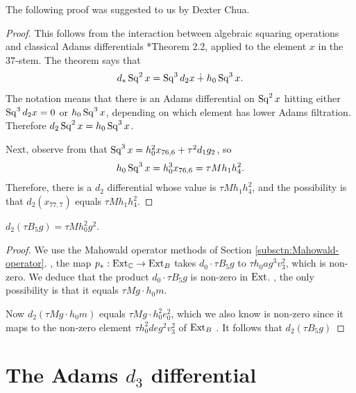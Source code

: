 The following proof was suggested to us by Dexter Chua.

\begin{proof}
This follows from the interaction between algebraic squaring
operations and classical Adams differentials \cite{Bruner84}*{Theorem 2.2},
applied to the element $x$ in the $37$-stem.
The theorem says that
\[
d_* \operatorname{Sq}^2 x = \operatorname{Sq}^3 d_2 x \dotplus h_0 \operatorname{Sq}^3 x.
\]
The notation means that there is an Adams differential on $\operatorname{Sq}^2 x$
hitting either $\operatorname{Sq}^3 d_2 x = 0$ or $h_0 \operatorname{Sq}^3 x$,
depending on which element has lower Adams filtration.
Therefore
$d_2 \operatorname{Sq}^2 x = h_0 \operatorname{Sq}^3 x$.

Next, observe from \cite{Bruner04} that
$\operatorname{Sq}^3 x = h_0^2 x_{76,6} + \tau^2 d_1 g_2$, so
\[
h_0 \operatorname{Sq}^3 x = h_0^3 x_{76,6} = \tau M h_1 h_4^2.
\]
Therefore, there is a $d_2$ differential whose value is
$\tau M h_1 h_4^2$, and the possibility is that
$d_2(x_{77,7})$ equals $\tau M h_1 h_4^2$.
\end{proof}

\begin{lemma}
\label{lem:d2-tB5g}
$d_2(\tau B_5 g) = \tau M h_0^2 g^2$.
\end{lemma}

\begin{proof}
We use the Mahowald operator methods of 
Section \ref{subsctn:Mahowald-operator}.
,
the map $p_*: \operatorname{Ext}_{\mathbb{C}} \rightarrow \operatorname{Ext}_B$ takes
$d_0 \cdot \tau B_5 g$ to
$\tau h_0 a g^3 v_3^2$, which is non-zero.
We deduce that the product $d_0 \cdot \tau B_5 g$ is non-zero
in $\operatorname{Ext}$.
,
the only possibility is that it equals $\tau M g \cdot h_0 m$.

Now $d_2(\tau M g \cdot h_0 m)$ equals
$\tau M g \cdot h_0^2 e_0^2$, which we also know is non-zero
since it maps to the non-zero element
$\tau h_0^2 d e g^2 v_3^2$ of $\operatorname{Ext}_B$
.
It follows that $d_2(\tau B_5 g)$ 
\end{proof}

\section{The Adams $d_3$ differential}
\label{sctn:Adams-d3}



